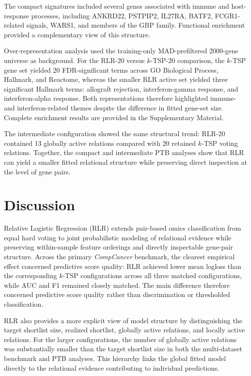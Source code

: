 \documentclass[preprint,12pt,a4paper]{elsarticle}
\begin{document}
The compact signatures included several genes associated with immune and host-response processes, including ANKRD22, PSTPIP2, IL27RA, BATF2, FCGR1-related signals, WARS1, and members of the GBP family. Functional enrichment provided a complementary view of this structure.

Over-representation analysis used the training-only MAD-prefiltered 2000-gene universe as background. For the RLR-20 versus $k$-TSP-20 comparison, the $k$-TSP gene set yielded 20 FDR-significant terms across GO Biological Process, Hallmark, and Reactome, whereas the smaller RLR active set yielded three significant Hallmark terms: allograft rejection, interferon-gamma response, and interferon-alpha response. Both representations therefore highlighted immune- and interferon-related themes despite the difference in fitted gene-set size. Complete enrichment results are provided in the Supplementary Material.

The intermediate configuration showed the same structural trend: RLR-20 contained 13 globally active relations compared with 20 retained $k$-TSP voting relations. Together, the compact and intermediate PTB analyses show that RLR can yield a smaller fitted relational structure while preserving direct inspection at the level of gene pairs.
\section{Discussion}\label{sec:discussion}

Relative Logistic Regression (RLR) extends pair-based omics classification from equal hard voting to joint probabilistic modeling of relational evidence while preserving within-sample feature orderings and directly inspectable gene-pair structure. Across the primary \emph{CompCancer} benchmark, the clearest empirical effect concerned predictive score quality: RLR achieved lower mean logloss than the corresponding $k$-TSP configurations across all three matched configurations, while AUC and F1 remained closely matched. The main difference therefore concerned predictive score quality rather than discrimination or thresholded classification.

RLR also provides a more explicit view of model structure by distinguishing the target shortlist size, realized shortlist, globally active relations, and locally active relations. For the larger configurations, the number of globally active relations was substantially smaller than the target shortlist size in both the multi-dataset benchmark and PTB analyses. This hierarchy links the global fitted model directly to the relational evidence contributing to individual predictions.
\end{document}
